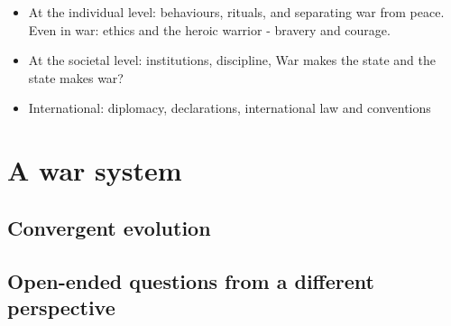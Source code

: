 \documentclass[
  letterpaper,
  DIV=11,
  numbers=noendperiod]{scrartcl}
\begin{document}
\begin{itemize}
\item
  At the individual level: behaviours, rituals, and separating war from
  peace. Even in war: ethics and the heroic warrior - bravery and
  courage.
\item
  At the societal level: institutions, discipline, War makes the state
  and the state makes war?
\item
  International: diplomacy, declarations, international law and
  conventions
\end{itemize}

\hypertarget{a-war-system}{%
\section{A war system}\label{a-war-system}}

\hypertarget{convergent-evolution}{%
\subsection{Convergent evolution}\label{convergent-evolution}}

\hypertarget{open-ended-questions-from-a-different-perspective}{%
\subsection{Open-ended questions from a different
perspective}\label{open-ended-questions-from-a-different-perspective}}
\end{document}
